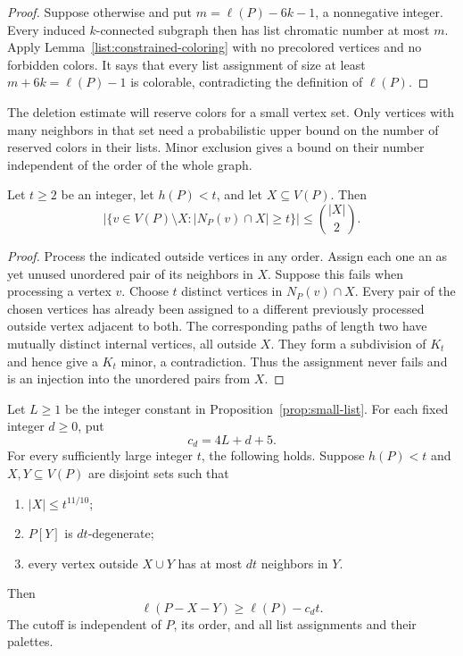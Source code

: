 \begin{proof}
Suppose otherwise and put $m=\ell(P)-6k-1$, a nonnegative integer.
Every induced $k$-connected subgraph then has list chromatic number at
most $m$. Apply Lemma~\ref{list:constrained-coloring} with no precolored
vertices and no forbidden colors. It says that every list assignment of
size at least $m+6k=\ell(P)-1$ is colorable, contradicting the definition
of $\ell(P)$.
\end{proof}

The deletion estimate will reserve colors for a small vertex set. Only
vertices with many neighbors in that set need a probabilistic upper bound
on the number of reserved colors in their lists. Minor exclusion gives a
bound on their number independent of the order of the whole graph.

\begin{lemma}\label{list:high-neighbor-count}
Let $t\ge2$ be an integer, let $h(P)<t$, and let $X\subseteq V(P)$. Then
\[
\bigl|\{v\in V(P)\setminus X:|N_P(v)\cap X|\ge t\}\bigr|
\le\binom{|X|}{2}.
\]
\end{lemma}

\begin{proof}
Process the indicated outside vertices in any order. Assign each one an
as yet unused unordered pair of its neighbors in $X$. Suppose this fails
when processing a vertex $v$. Choose $t$ distinct vertices in
$N_P(v)\cap X$. Every pair of the chosen vertices has already been
assigned to a different previously processed outside vertex adjacent to
both. The corresponding paths of length two have mutually distinct
internal vertices, all outside $X$. They form a subdivision of $K_t$ and
hence give a $K_t$ minor, a contradiction. Thus the assignment never fails
and is an injection into the unordered pairs from $X$.
\end{proof}

\begin{lemma}\label{lem:additive-deletion}
Let $L\ge1$ be the integer constant in Proposition~\ref{prop:small-list}.
For each fixed integer $d\ge0$, put
\[
c_d=4L+d+5.
\]
For every sufficiently large integer $t$, the following holds. Suppose
$h(P)<t$ and $X,Y\subseteq V(P)$ are disjoint sets such that
\begin{enumerate}[label=\textup{(\roman*)}]
\item $|X|\le t^{11/10}$;
\item $P[Y]$ is $dt$-degenerate;
\item every vertex outside $X\cup Y$ has at most $dt$ neighbors in $Y$.
\end{enumerate}
Then
\[
\ell(P-X-Y)\ge\ell(P)-c_dt.
\]
The cutoff is independent of $P$, its order, and all list assignments and
their palettes.
\end{lemma}

